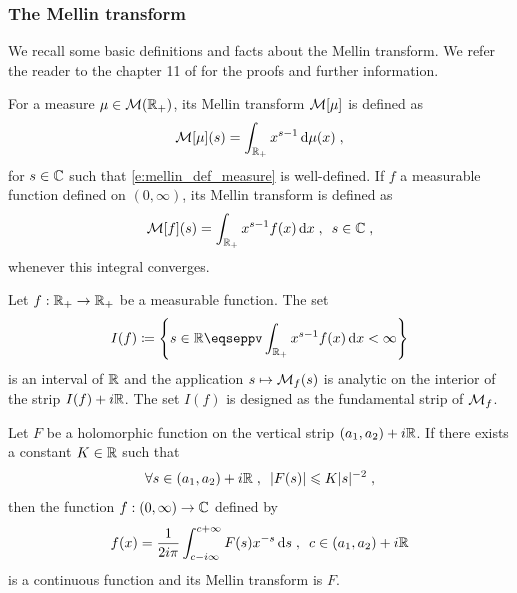 \subsubsection{The Mellin transform}

We recall some basic definitions and facts about the Mellin transform. We refer the reader to the chapter 11 of \cite{misra1986transform} for the proofs and further information. 

\begin{definition} For a measure $\mu \in \mathcal{M}(\mathbb{R}_+)$, its Mellin transform $\mathcal{M}[\mu]$ is defined as 
\begin{equation}
        \label{e:mellin_def_measure}
        \mathcal{M}[\mu](s) = \int_{\mathbb{R}_+} x^{s-1} \,\mathrm{d} \mu(x) \; ,
    \end{equation}
    for $s \in \mathbb{C}$ such that \eqref{e:mellin_def_measure} is well-defined.     
If $f$ a measurable function defined on $(0, \infty)$, its Mellin transform is defined as 
\begin{equation}
    \label{e:mellin_def_function}
    \mathcal{M}[f](s) = \int_{\mathbb{R}_+} x^{s-1} f(x) \,\mathrm{d} x 
    \; , \enspace
    s \in \mathbb{C}
    \; ,
\end{equation}
whenever this integral converges. 
\end{definition}

\begin{lemma}\label{lm:interval_mellin}
    Let $f : \mathbb{R}_+ \to \mathbb{R}_+$ be a measurable function. The set 
    $$
    I(f) \coloneqq \left\{ s \in \RR \eqseppv \int_{\RR_+} x^{s-1} f(x) \diff x < \infty \right\}
    $$ 
    is an interval of $\mathbb{R}$ and the application $s \mapsto \mathcal{M}_f(s)$ is analytic on the interior of the strip $I(f) + i\mathbb{R}$. 
    The set $I(f)$ is designed as the fundamental strip of $\mathcal{M}_f$.
\end{lemma}

\begin{lemma} Let $F$ be a holomorphic function on the vertical strip $(a_1, a_2)+i\mathbb{R}$. If there exists a constant $K \in \mathbb{R}$ such that 
    \begin{align*}
        \forall s \in (a_1, a_2)+i\mathbb{R}
        \; , \enspace
        |F(s)| \leqslant K|s|^{-2}
        \; ,
    \end{align*}
    then the function $f:(0,\infty) \to \mathbb{C}$ defined by
    \begin{align}
        \label{eq:mellin_inversion}
        f(x) = \frac{1}{2i\pi} \int_{c-i\infty}^{c+\infty} F(s)x^{-s} \,\mathrm{d} s
        \; , \enspace
        c \in (a_1, a_2)+i\mathbb{R}
    \end{align}
    is a continuous function and its Mellin transform is $F$. 
\end{lemma}

